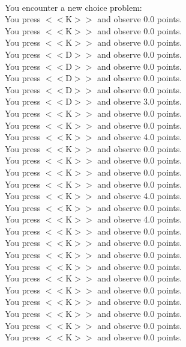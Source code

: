 \documentclass[pdflatex,sn-nature]{sn-jnl}%
\theoremstyle{thmstyleone}%
\theoremstyle{thmstyletwo}%
\theoremstyle{thmstylethree}%
\begin{document}
 $~$\\ 
You encounter a new choice problem: $~$\\ 
You press $<<$K$>>$ and observe 0.0 points. $~$\\ 
You press $<<$K$>>$ and observe 0.0 points. $~$\\ 
You press $<<$K$>>$ and observe 0.0 points. $~$\\ 
You press $<<$D$>>$ and observe 0.0 points. $~$\\ 
You press $<<$D$>>$ and observe 0.0 points. $~$\\ 
You press $<<$D$>>$ and observe 0.0 points. $~$\\ 
You press $<<$D$>>$ and observe 0.0 points. $~$\\ 
You press $<<$D$>>$ and observe 3.0 points. $~$\\ 
You press $<<$K$>>$ and observe 0.0 points. $~$\\ 
You press $<<$K$>>$ and observe 0.0 points. $~$\\ 
You press $<<$K$>>$ and observe 4.0 points. $~$\\ 
You press $<<$K$>>$ and observe 0.0 points. $~$\\ 
You press $<<$K$>>$ and observe 0.0 points. $~$\\ 
You press $<<$K$>>$ and observe 0.0 points. $~$\\ 
You press $<<$K$>>$ and observe 0.0 points. $~$\\ 
You press $<<$K$>>$ and observe 4.0 points. $~$\\ 
You press $<<$K$>>$ and observe 0.0 points. $~$\\ 
You press $<<$K$>>$ and observe 4.0 points. $~$\\ 
You press $<<$K$>>$ and observe 0.0 points. $~$\\ 
You press $<<$K$>>$ and observe 0.0 points. $~$\\ 
You press $<<$K$>>$ and observe 0.0 points. $~$\\ 
You press $<<$K$>>$ and observe 0.0 points. $~$\\ 
You press $<<$K$>>$ and observe 0.0 points. $~$\\ 
You press $<<$K$>>$ and observe 0.0 points. $~$\\ 
You press $<<$K$>>$ and observe 0.0 points. $~$\\ 
You press $<<$K$>>$ and observe 0.0 points. $~$\\ 
You press $<<$K$>>$ and observe 0.0 points. $~$\\ 
You press $<<$K$>>$ and observe 0.0 points. $~$\\ 
\end{document}
